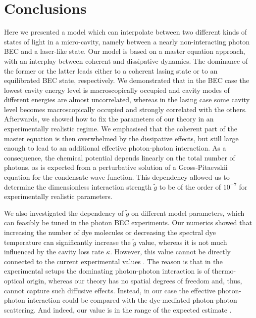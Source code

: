 \documentclass[12pt, a4paper]{iopart}
\begin{document}
\section{Conclusions}
\label{sec:con}

Here we presented a model which can interpolate between two different kinds of states of light in a micro-cavity, namely between a nearly non-interacting photon BEC and a laser-like state. Our model is based on a master equation approach, with an interplay between coherent and dissipative dynamics. The dominance of the former or the latter leads either to a coherent lasing state or to an equilibrated BEC state, respectively. We demonstrated that in the BEC case the lowest cavity energy level is macroscopically occupied and cavity modes of different energies are almost uncorrelated, whereas in the lasing case some cavity level becomes macroscopically occupied and strongly correlated with the others. Afterwards, we showed how to fix the parameters of our theory in an experimentally realistic regime. We emphasised that the coherent part of the master equation is then overwhelmed by the dissipative effects, but still large enough to lead to an additional effective photon-photon interaction. As a consequence, the chemical potential depends linearly on the total number of photons, as is expected from a perturbative solution of a Gross-Pitaevskii equation for the condensate wave function. This dependency allowed us to determine the dimensionless interaction strength $\tilde{g}$ to be of the order of $10^{-7}$ for experimentally realistic parameters.

We also investigated the dependency of $\tilde{g}$ on different model parameters, which can feasibly be tuned in the photon BEC experiments. Our numerics showed that increasing the number of dye molecules or decreasing the spectral dye temperature can significantly increase the $\tilde{g}$ value, whereas it is not much influenced by the cavity loss rate $\kappa$. However, this value cannot be directly connected to the current experimental values
\cite{Klaers_BEC_of_photons,NymanStrength,Oosten}. The reason is that in the experimental setups the dominating photon-photon interaction is of thermo-optical origin, whereas our theory has no spatial degrees of freedom and, thus, cannot capture such diffusive effects. Instead, in our case the effective photon-photon interaction could be compared with the dye-mediated photon-photon scattering. And indeed, our value is in the range of the expected estimate \cite{StoofPRL-Interaction}.
\end{document}
